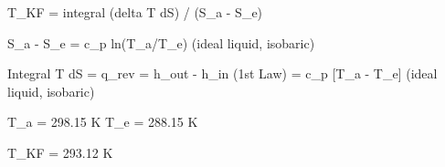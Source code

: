 T_KF = integral (delta T dS) / (S_a - S_e)  

S_a - S_e = c_p ln(T_a/T_e) (ideal liquid, isobaric)  

Integral T dS = q_rev = h_out - h_in (1st Law)  
= c_p [T_a - T_e] (ideal liquid, isobaric)  

T_a = 298.15 K  
T_e = 288.15 K  

T_KF = 293.12 K